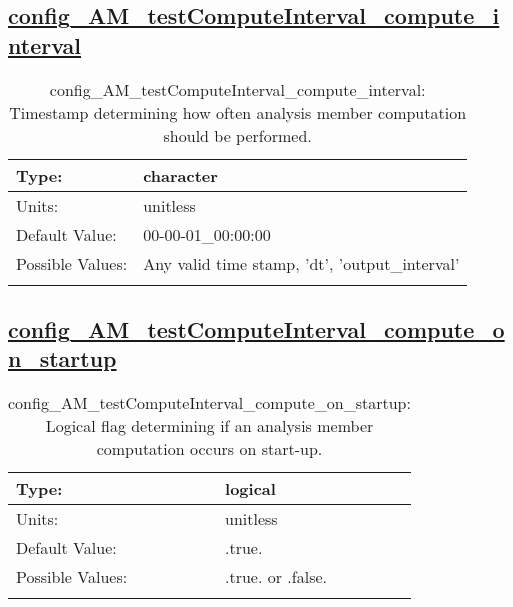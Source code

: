 \subsection[config\_AM\_testComputeInterval\_compute\_interval]{\hyperref[sec:nm_tab_AM_testComputeInterval]{config\_AM\_testComputeInterval\_compute\_interval}}
\label{subsec:nm_sec_config_AM_testComputeInterval_compute_interval}
\begin{center}
\begin{longtable}{| p{2.0in} || p{4.0in} |}
    \hline
    Type: & character \\
    \hline
    Units: & \si{unitless} \\
    \hline
    Default Value: & 00-00-01\_00:00:00 \\
    \hline
    Possible Values: & Any valid time stamp, 'dt', 'output\_interval' \\
    \hline
    \caption{config\_AM\_testComputeInterval\_compute\_interval: Timestamp determining how often analysis member computation should be performed.}
\end{longtable}
\end{center}
\subsection[config\_AM\_testComputeInterval\_compute\_on\_startup]{\hyperref[sec:nm_tab_AM_testComputeInterval]{config\_AM\_testComputeInterval\_compute\_on\_startup}}
\label{subsec:nm_sec_config_AM_testComputeInterval_compute_on_startup}
\begin{center}
\begin{longtable}{| p{2.0in} || p{4.0in} |}
    \hline
    Type: & logical \\
    \hline
    Units: & \si{unitless} \\
    \hline
    Default Value: & .true. \\
    \hline
    Possible Values: & .true. or .false. \\
    \hline
    \caption{config\_AM\_testComputeInterval\_compute\_on\_startup: Logical flag determining if an analysis member computation occurs on start-up.}
\end{longtable}
\end{center}

